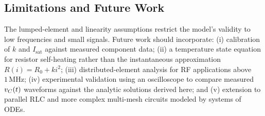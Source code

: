 \subsection{Limitations and Future Work}

The lumped-element and linearity assumptions restrict the model's validity to
low frequencies and small signals.
Future work should incorporate:
(i) calibration of $k$ and $I_{\mathrm{sat}}$ against measured component data;
(ii) a temperature state equation for resistor self-heating rather than the
instantaneous approximation $R(i)=R_0+ki^2$;
(iii) distributed-element analysis for RF applications above $1\,\mathrm{MHz}$;
(iv) experimental validation using an oscilloscope to compare measured
$v_C(t)$ waveforms against the analytic solutions derived here; and
(v) extension to parallel RLC and more complex multi-mesh circuits modeled
by systems of ODEs.

